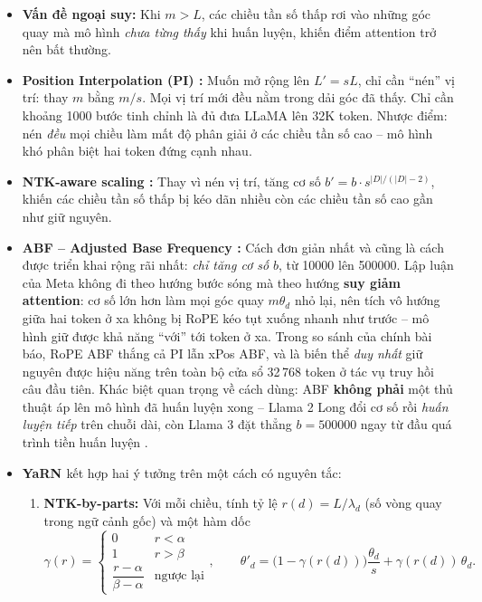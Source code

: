 \begin{itemize}
	\item \textbf{Vấn đề ngoại suy:} Khi $m > L$, các chiều tần số thấp rơi vào những góc quay mà mô hình \emph{chưa từng thấy} khi huấn luyện, khiến điểm attention trở nên bất thường.
	\item \textbf{Position Interpolation (PI) \cite{chen2023extending}:} Muốn mở rộng lên $L' = sL$, chỉ cần “nén” vị trí: thay $m$ bằng $m/s$. Mọi vị trí mới đều nằm trong dải góc đã thấy. Chỉ cần khoảng 1000 bước tinh chỉnh là đủ đưa LLaMA lên 32K token. Nhược điểm: nén \emph{đều} mọi chiều làm mất độ phân giải ở các chiều tần số cao -- mô hình khó phân biệt hai token đứng cạnh nhau.
	\item \textbf{NTK-aware scaling \cite{bloc972023ntkaware}:} Thay vì nén vị trí, tăng cơ số $b' = b \cdot s^{|D|/(|D|-2)}$, khiến các chiều tần số thấp bị kéo dãn nhiều còn các chiều tần số cao gần như giữ nguyên.
	\item \textbf{ABF -- Adjusted Base Frequency \cite{xiong2023effective}:} Cách đơn giản nhất và cũng là cách được triển khai rộng rãi nhất: \emph{chỉ tăng cơ số} $b$, từ 10000 lên 500000. Lập luận của Meta không đi theo hướng bước sóng mà theo hướng \textbf{suy giảm attention}: cơ số lớn hơn làm mọi góc quay $m\theta_d$ nhỏ lại, nên tích vô hướng giữa hai token ở xa không bị RoPE kéo tụt xuống nhanh như trước -- mô hình giữ được khả năng “với” tới token ở xa. Trong so sánh của chính bài báo, RoPE ABF thắng cả PI lẫn xPos ABF, và là biến thể \emph{duy nhất} giữ nguyên được hiệu năng trên toàn bộ cửa sổ 32\,768 token ở tác vụ truy hồi câu đầu tiên. Khác biệt quan trọng về cách dùng: ABF \textbf{không phải} một thủ thuật áp lên mô hình đã huấn luyện xong -- Llama 2 Long đổi cơ số rồi \emph{huấn luyện tiếp} trên chuỗi dài, còn Llama 3 đặt thẳng $b = 500000$ ngay từ đầu quá trình tiền huấn luyện \cite{grattafiori2024llama3}.
	\item \textbf{YaRN \cite{peng2023yarn}} kết hợp hai ý tưởng trên một cách có nguyên tắc:
	\begin{enumerate}
		\item \textbf{NTK-by-parts:} Với mỗi chiều, tính tỷ lệ $r(d) = L/\lambda_d$ (số vòng quay trong ngữ cảnh gốc) và một hàm dốc
		\[
		\gamma(r) = \begin{cases} 0 & r < \alpha \\ 1 & r > \beta \\ \dfrac{r-\alpha}{\beta-\alpha} & \text{ngược lại}\end{cases}, \qquad
		\theta'_d = \big(1-\gamma(r(d))\big)\frac{\theta_d}{s} + \gamma(r(d))\,\theta_d .
\]
\end{enumerate}
\end{itemize}
